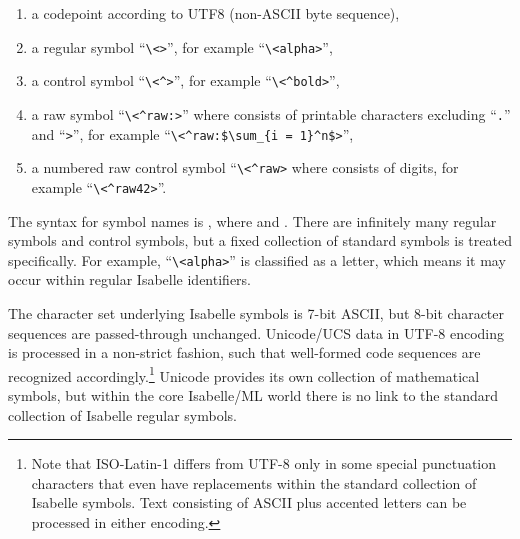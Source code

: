 \begin{isabellebody}
\begin{isamarkuptext}
\begin{enumerate}
  \item a codepoint according to UTF8 (non-ASCII byte sequence),

  \item a regular symbol ``\verb,\,\verb,<,\verb,>,'',
  for example ``\verb,\,\verb,<alpha>,'',

  \item a control symbol ``\verb,\,\verb,<^,\verb,>,'',
  for example ``\verb,\,\verb,<^bold>,'',

  \item a raw symbol ``\verb,\,\verb,<^raw:,\verb,>,''
  where  consists of printable characters excluding
  ``\verb,.,'' and ``\verb,>,'', for example
  ``\verb,\,\verb,<^raw:$\sum_{i = 1}^n$>,'',

  \item a numbered raw control symbol ``\verb,\,\verb,<^raw,\verb,>, where  consists of digits, for example
  ``\verb,\,\verb,<^raw42>,''.

  \end{enumerate}

  \noindent The  syntax for symbol names is , where  and .  There are infinitely many
  regular symbols and control symbols, but a fixed collection of
  standard symbols is treated specifically.  For example,
  ``\verb,\,\verb,<alpha>,'' is classified as a letter, which means it
  may occur within regular Isabelle identifiers.

  The character set underlying Isabelle symbols is 7-bit ASCII, but
  8-bit character sequences are passed-through unchanged.  Unicode/UCS
  data in UTF-8 encoding is processed in a non-strict fashion, such
  that well-formed code sequences are recognized
  accordingly.\footnote{Note that ISO-Latin-1 differs from UTF-8 only
  in some special punctuation characters that even have replacements
  within the standard collection of Isabelle symbols.  Text consisting
  of ASCII plus accented letters can be processed in either encoding.}
  Unicode provides its own collection of mathematical symbols, but
  within the core Isabelle/ML world there is no link to the standard
  collection of Isabelle regular symbols.


\end{isamarkuptext}
\end{isabellebody}
